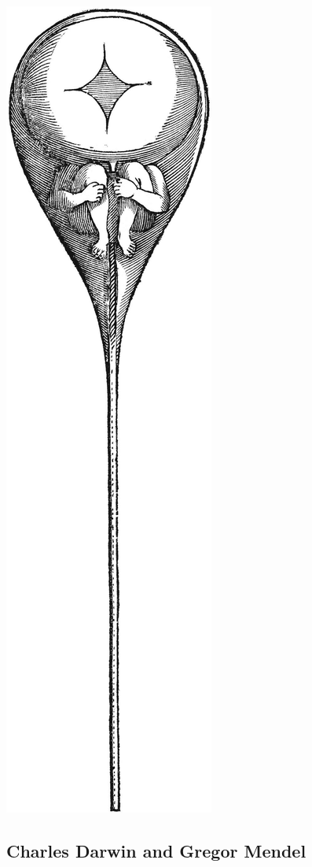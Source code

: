 \documentclass[
]{book}
\begin{document}
\includegraphics[width=0.5\linewidth]{figs/introduction/homunculus}

\hypertarget{charles-darwin-and-gregor-mendel}{%
\subsection{Charles Darwin and Gregor Mendel}\label{charles-darwin-and-gregor-mendel}}
\end{document}
